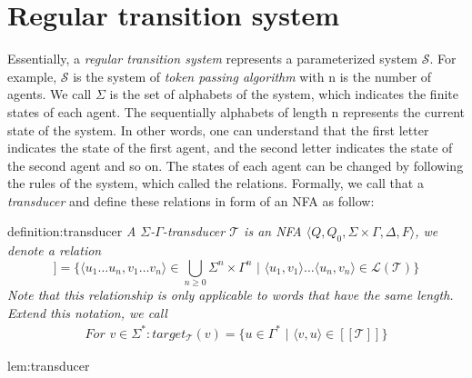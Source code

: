 \section{Regular transition system}\label{section:rts}
Essentially, a \textit{regular transition system} represents a parameterized system $\mathcal{S}$.
For example, $\mathcal{S}$ is the system of \textit{token passing algorithm} with n is the number
of agents. We call $\Sigma$ is the set of alphabets of the system, which indicates the finite states of
each agent. The sequentially alphabets of length n represents the current state of the system.
In other words, one can understand that the first letter indicates the state of the first agent, 
and the second letter indicates the state of the second agent and so on.
The states of each agent can be changed by following the rules of the system,
which called the relations. Formally, we call that a \textit{transducer} and define these relations in form of an NFA as follow:
\begin{theo}[Transducer]{definition:transducer}
    \textit{
        A $\Sigma$-$\Gamma$-\textit{transducer} $\mathcal{T}$ is an \textit{NFA} 
        $\langle Q, Q_0, \Sigma \times \Gamma, \Delta, F \rangle$,
        we denote a relation 
        \begin{equation*}
          [[\mathcal{T}]] = \lbrace \langle u_1 \dots u_n, v_1 \dots v_n \rangle \in \bigcup_{n \geq 0} \Sigma^{n} \times \Gamma^{n} 
          \,\,|\,\, \langle u_1, v_1 \rangle \dots \langle u_n, v_n \rangle \in \mathcal{L}(\mathcal{T}) \rbrace 
        \end{equation*}
        Note that this relationship is only applicable to words that have the same length.
        Extend this notation, we call
        \begin{align*} 
            For \,\, v \in \Sigma^*: target_{\mathcal{T}}(v) = \lbrace u \in \Gamma^*\,\, | \,\, \langle v,u \rangle \in [[\mathcal{T}]] \rbrace 
        \end{align*}
    }
\end{theo}
\begin{lem}{lem:transducer}
\end{lem}

